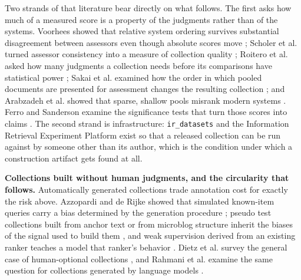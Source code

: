 \documentclass[acmsmall]{acmart}
\begin{document}
Two strands of that literature bear directly on what follows. The first asks how much of a measured score is a property of the judgments rather than of the systems. Voorhees showed that relative system ordering survives substantial disagreement between assessors even though absolute scores move \cite{voorhees2000variations}; Scholer et al. turned assessor consistency into a measure of collection quality \cite{scholer2011consistency}; Roitero et al. asked how many judgments a collection needs before its comparisons have statistical power \cite{roitero2023crowdpower}; Sakai et al. examined how the order in which pooled documents are presented for assessment changes the resulting collection \cite{sakai2022pooling}; and Arabzadeh et al. showed that sparse, shallow pools misrank modern systems \cite{arabzadeh2022shallow}. Ferro and Sanderson examine the significance tests that turn those scores into claims \cite{ferro2022testatest}. The second strand is infrastructure: \texttt{ir\_datasets} \cite{macavaney2021irdatasets} and the Information Retrieval Experiment Platform \cite{frobe2023platform} exist so that a released collection can be run against by someone other than its author, which is the condition under which a construction artifact gets found at all.

\textbf{Collections built without human judgments, and the circularity that follows.} Automatically generated collections trade annotation cost for exactly the risk above. Azzopardi and de Rijke showed that simulated known-item queries carry a bias determined by the generation procedure \cite{azzopardi2007simulated}; pseudo test collections built from anchor text or from microblog structure inherit the biases of the signal used to build them \cite{asadi2011pseudo,berendsen2013pseudo}, and weak supervision derived from an existing ranker teaches a model that ranker's behavior \cite{dehghani2017weak}. Dietz et al. survey the general case of human-optional collections \cite{dietz2020humansoptional}, and Rahmani et al. examine the same question for collections generated by language models \cite{rahmani2024synthetic}.
\end{document}
